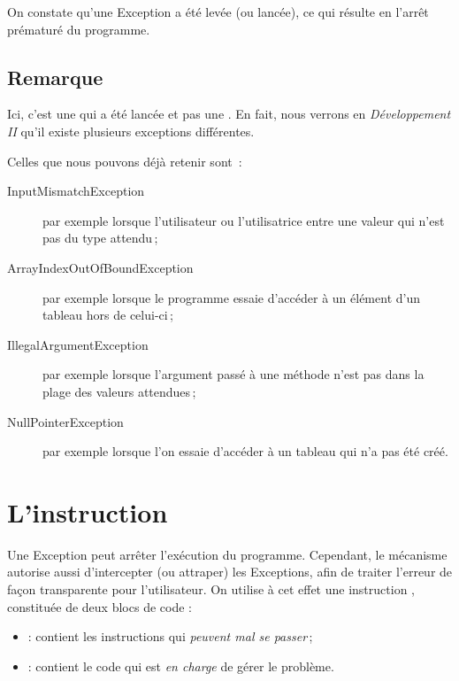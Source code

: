 On constate qu'une Exception a été levée (ou \og lancée\fg), ce qui résulte en l'arrêt prématuré du programme.


\subsection*{Remarque}

Ici, c'est une  qui a été lancée et pas une . En fait, nous verrons en \textit{Développement II} qu'il existe plusieurs exceptions différentes. 

Celles que nous pouvons déjà retenir sont~:

\begin{description}

	\item[InputMismatchException] par exemple lorsque l'utilisateur ou l'utilisatrice entre une valeur qui n'est pas du type attendu\,;

	\item[ArrayIndexOutOfBoundException] par exemple lorsque le programme essaie d'accéder à un élément d'un tableau hors de celui-ci\,;

	\item[IllegalArgumentException] par exemple lorsque l'argument passé à une méthode n'est pas dans la plage des valeurs attendues\,;

	\item[NullPointerException] par exemple lorsque l'on essaie d'accéder à un tableau qui n'a pas été créé.

\end{description}

\section{L'instruction }
Une Exception peut arrêter l'exécution du programme. Cependant, le mécanisme autorise aussi d'intercepter (ou \og attraper\fg) les Exceptions, afin de traiter l'erreur de façon transparente pour l'utilisateur. On utilise à cet effet une instruction , constituée de deux blocs de code :
\begin{itemize}
\item {} : contient les instructions qui \emph{peuvent mal se passer}\,;
\item {} : contient le code qui est \emph{en charge} de gérer le problème.
\end{itemize}

